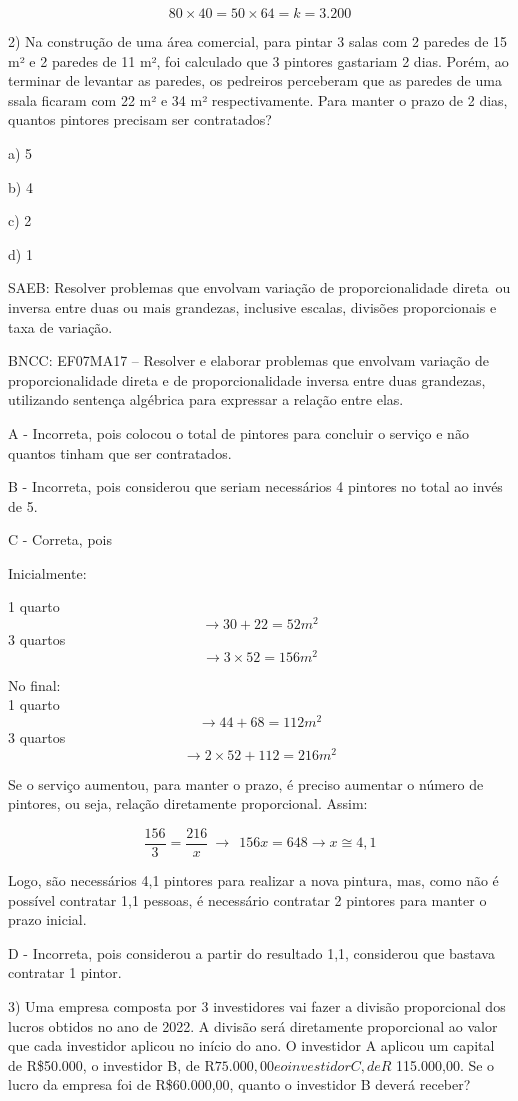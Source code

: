 \[80 \times 40 = 50 \times 64 = k = 3.200\]

2) Na construção de uma área comercial, para pintar 3 salas com 2
paredes de 15 m² e 2 paredes de 11 m², foi calculado que 3 pintores
gastariam 2 dias. Porém, ao terminar de levantar as paredes, os
pedreiros perceberam que as paredes de uma ssala ficaram com 22 m² e 34
m² respectivamente. Para manter o prazo de 2 dias, quantos pintores
precisam ser contratados?

a) 5

b) 4

c) 2

d) 1

SAEB: Resolver problemas que envolvam variação de proporcionalidade
direta~ou inversa entre duas ou mais grandezas, inclusive escalas,
divisões proporcionais e taxa de variação.

BNCC: EF07MA17 -- Resolver e elaborar problemas que envolvam variação de
proporcionalidade direta e de proporcionalidade inversa entre duas
grandezas, utilizando sentença algébrica para expressar a relação entre
elas.

A - Incorreta, pois colocou o total de pintores para concluir o serviço
e não quantos tinham que ser contratados.

B - Incorreta, pois considerou que seriam necessários 4 pintores no
total ao invés de 5.

C - Correta, pois

Inicialmente:

1 quarto \[\rightarrow 30 + 22 = 52m^{2}\] 3 quartos
\[\rightarrow 3 \times 52 = 156m^{2}\]

No final:\\
1 quarto \[\rightarrow 44 + 68 = 112m^{2}\] 3 quartos
\[\rightarrow 2 \times 52 + 112 = 216m^{2}\]

Se o serviço aumentou, para manter o prazo, é preciso aumentar o número
de pintores, ou seja, relação diretamente proporcional. Assim:

\[\frac{156}{3} = \frac{216}{x}\  \rightarrow \ \ 156x = 648 \rightarrow x \cong 4,1\]

Logo, são necessários 4,1 pintores para realizar a nova pintura, mas,
como não é possível contratar 1,1 pessoas, é necessário contratar 2
pintores para manter o prazo inicial.

D - Incorreta, pois considerou a partir do resultado 1,1, considerou que
bastava contratar 1 pintor.

3) Uma empresa composta por 3 investidores vai fazer a divisão
proporcional dos lucros obtidos no ano de 2022. A divisão será
diretamente proporcional ao valor que cada investidor aplicou no início
do ano. O investidor A aplicou um capital de R\$50.000, o investidor B,
de R\(75.000,00 e o investidor C, de R\) 115.000,00. Se o lucro da
empresa foi de R\$60.000,00, quanto o investidor B deverá receber?

